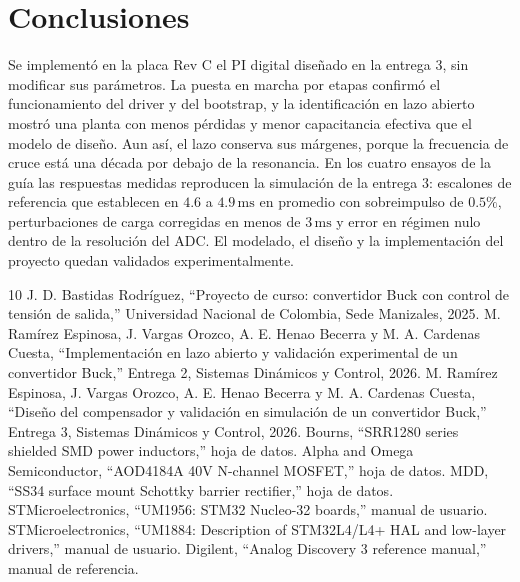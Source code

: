 \documentclass[conference,letterpaper]{IEEEtran}
\newcommand{\unit}[1]{\,\mathrm{#1}}
\begin{document}
\section{Conclusiones}
Se implementó en la placa Rev C el PI digital diseñado en la entrega 3, sin modificar sus parámetros. La puesta en marcha por etapas confirmó el funcionamiento del driver y del bootstrap, y la identificación en lazo abierto mostró una planta con menos pérdidas y menor capacitancia efectiva que el modelo de diseño. Aun así, el lazo conserva sus márgenes, porque la frecuencia de cruce está una década por debajo de la resonancia. En los cuatro ensayos de la guía las respuestas medidas reproducen la simulación de la entrega 3: escalones de referencia que establecen en $4.6$ a $4.9\unit{ms}$ en promedio con sobreimpulso de $0.5\%$, perturbaciones de carga corregidas en menos de $3\unit{ms}$ y error en régimen nulo dentro de la resolución del ADC. El modelado, el diseño y la implementación del proyecto quedan validados experimentalmente.

\begin{thebibliography}{10}
 J. D. Bastidas Rodríguez, ``Proyecto de curso: convertidor Buck con control de tensión de salida,'' Universidad Nacional de Colombia, Sede Manizales, 2025.
 M. Ramírez Espinosa, J. Vargas Orozco, A. E. Henao Becerra y M. A. Cardenas Cuesta, ``Implementación en lazo abierto y validación experimental de un convertidor Buck,'' Entrega 2, Sistemas Dinámicos y Control, 2026.
 M. Ramírez Espinosa, J. Vargas Orozco, A. E. Henao Becerra y M. A. Cardenas Cuesta, ``Diseño del compensador y validación en simulación de un convertidor Buck,'' Entrega 3, Sistemas Dinámicos y Control, 2026.
 Bourns, ``SRR1280 series shielded SMD power inductors,'' hoja de datos.
 Alpha and Omega Semiconductor, ``AOD4184A 40V N-channel MOSFET,'' hoja de datos.
 MDD, ``SS34 surface mount Schottky barrier rectifier,'' hoja de datos.
 STMicroelectronics, ``UM1956: STM32 Nucleo-32 boards,'' manual de usuario.
 STMicroelectronics, ``UM1884: Description of STM32L4/L4+ HAL and low-layer drivers,'' manual de usuario.
 Digilent, ``Analog Discovery 3 reference manual,'' manual de referencia.
\end{thebibliography}
\end{document}

